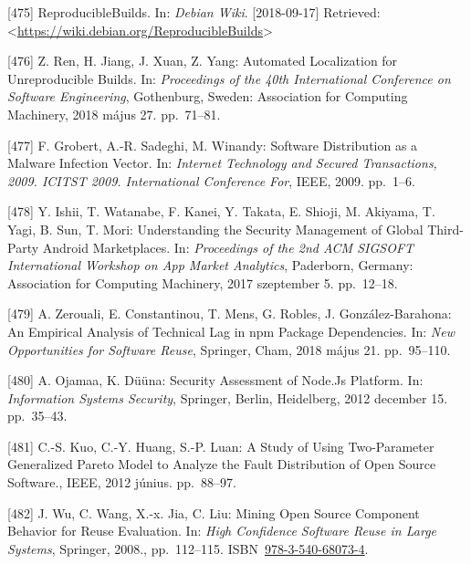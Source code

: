 \documentclass[12pt,magyar,a4paper,oneside]{scrreprt}
\newenvironment{cslreferences}%
  {}%
  {\par}
\begin{document}
\begin{cslreferences}
\leavevmode\hypertarget{ref-noauthor_reproduciblebuilds_nodate}{}%
{[}475{]} ReproducibleBuilds. In: \emph{Debian Wiki}. {[}2018-09-17{]}
Retrieved:
\textless{}\url{https://wiki.debian.org/ReproducibleBuilds}\textgreater{}

\leavevmode\hypertarget{ref-ren_automated_2018}{}%
{[}476{]} Z. Ren, H. Jiang, J. Xuan, Z. Yang: Automated Localization for
Unreproducible Builds. In: \emph{Proceedings of the 40th International
Conference on Software Engineering}, Gothenburg, Sweden: Association for
Computing Machinery, 2018 május 27. pp.~71--81.

\leavevmode\hypertarget{ref-grobert_software_2009}{}%
{[}477{]} F. Grobert, A.-R. Sadeghi, M. Winandy: Software Distribution
as a Malware Infection Vector. In: \emph{Internet Technology and Secured
Transactions, 2009. ICITST 2009. International Conference For}, IEEE,
2009. pp.~1--6.

\leavevmode\hypertarget{ref-ishii_understanding_2017}{}%
{[}478{]} Y. Ishii, T. Watanabe, F. Kanei, Y. Takata, E. Shioji, M.
Akiyama, T. Yagi, B. Sun, T. Mori: Understanding the Security Management
of Global Third-Party Android Marketplaces. In: \emph{Proceedings of the
2nd ACM SIGSOFT International Workshop on App Market Analytics},
Paderborn, Germany: Association for Computing Machinery, 2017 szeptember
5. pp.~12--18.

\leavevmode\hypertarget{ref-zerouali_empirical_2018}{}%
{[}479{]} A. Zerouali, E. Constantinou, T. Mens, G. Robles, J.
González-Barahona: An Empirical Analysis of Technical Lag in npm Package
Dependencies. In: \emph{New Opportunities for Software Reuse}, Springer,
Cham, 2018 május 21. pp.~95--110.

\leavevmode\hypertarget{ref-ojamaa_security_2012}{}%
{[}480{]} A. Ojamaa, K. Düüna: Security Assessment of Node.Js Platform.
In: \emph{Information Systems Security}, Springer, Berlin, Heidelberg,
2012 december 15. pp.~35--43.

\leavevmode\hypertarget{ref-kuo_study_2012}{}%
{[}481{]} C.-S. Kuo, C.-Y. Huang, S.-P. Luan: A Study of Using
Two-Parameter Generalized Pareto Model to Analyze the Fault Distribution
of Open Source Software., IEEE, 2012 június. pp.~88--97.

\leavevmode\hypertarget{ref-wu_mining_2008}{}%
{[}482{]} J. Wu, C. Wang, X.-x. Jia, C. Liu: Mining Open Source
Component Behavior for Reuse Evaluation. In: \emph{High Confidence
Software Reuse in Large Systems}, Springer, 2008., pp.~112--115.
ISBN~\href{https://worldcat.org/isbn/978-3-540-68073-4}{978-3-540-68073-4}.


\end{cslreferences}
\end{document}
